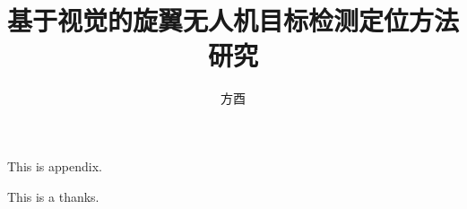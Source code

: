 \documentclass[twoside,UTF8]{nputhesis}
\title[Research on Vision-based Object Detection and Localization for Rotorcraft UAVs]{基于视觉的旋翼无人机目标检测定位方法研究}
\author[You Fang]{方酉}
\begin{document}
\makecover  %
\frontmatter


\tableofcontents 
\mainmatter  %













\backmatter



\Appendix
This is appendix.

\Thanks
This is a thanks.

\Work

\statement
\end{document}

